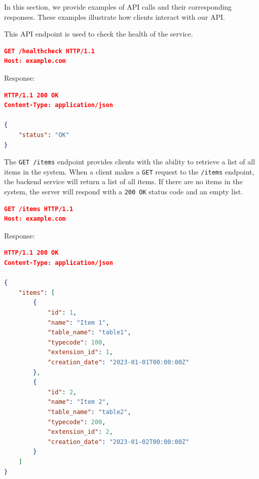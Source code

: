 \label{subsubsec:api-examples}

In this section, we provide examples of API calls and their corresponding responses.
These examples illustrate how clients interact with our API.


This API endpoint is used to check the health of the service.

\begin{lstlisting}[language=json,label={lst:lstlisting6}]
GET /healthcheck HTTP/1.1
Host: example.com
\end{lstlisting}

Response:

\begin{lstlisting}[language=json,label={lst:lstlisting4}]
HTTP/1.1 200 OK
Content-Type: application/json

{
    "status": "OK"
}
\end{lstlisting}


The \texttt{GET /items} endpoint provides clients with the ability to retrieve a list of all items in the system.
When a client makes a \texttt{GET} request to the \texttt{/items} endpoint, the backend service will return a list of all items.
If there are no items in the system, the server will respond with a \texttt{200 OK} status code and an empty list.

\begin{lstlisting}[language=json,label={lst:lstlisting3}]
GET /items HTTP/1.1
Host: example.com
\end{lstlisting}

Response:

\begin{lstlisting}[language=json,label={lst:lstlisting}]
HTTP/1.1 200 OK
Content-Type: application/json

{
    "items": [
        {
            "id": 1,
            "name": "Item 1",
            "table_name": "table1",
            "typecode": 100,
            "extension_id": 1,
            "creation_date": "2023-01-01T00:00:00Z"
        },
        {
            "id": 2,
            "name": "Item 2",
            "table_name": "table2",
            "typecode": 200,
            "extension_id": 2,
            "creation_date": "2023-01-02T00:00:00Z"
        }
    ]
}
\end{lstlisting}


